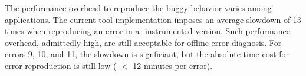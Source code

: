 The performance overhead to reproduce the buggy behavior varies
among applications. The current tool implementation
imposes an average slowdown of 13 times when reproducing
an error in a \ourtool-instrumented version.
Such performance overhead, admittedly high, are still acceptable
for offline error diagnosis.
For errors 9, 10, and 11, the slowdown is signficiant, but the
absolute time cost for error reproduction is still low ( $<$ 12 minutes per error).  





